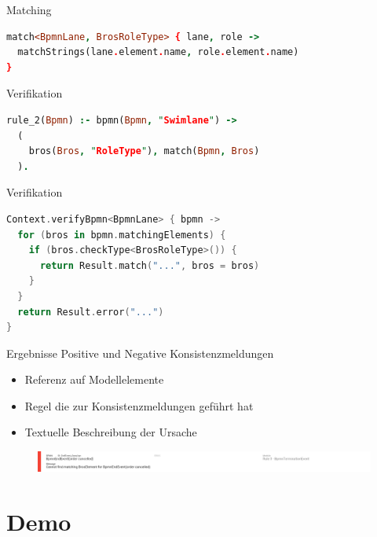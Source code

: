 \begin{frame}[fragile]{Matching}
\begin{lstlisting}[language=Prolog]
match<BpmnLane, BrosRoleType> { lane, role ->
  matchStrings(lane.element.name, role.element.name)
}
\end{lstlisting}
\end{frame}

\begin{frame}[fragile]{Verifikation}
\begin{lstlisting}[language=Prolog]
rule_2(Bpmn) :- bpmn(Bpmn, "Swimlane") ->
  (
    bros(Bros, "RoleType"), match(Bpmn, Bros)
  ).
\end{lstlisting}
\end{frame}
\begin{frame}[fragile]{Verifikation}
\begin{lstlisting}[language=Kotlin]
Context.verifyBpmn<BpmnLane> { bpmn ->
  for (bros in bpmn.matchingElements) {
    if (bros.checkType<BrosRoleType>()) {
      return Result.match("...", bros = bros)
    }
  }
  return Result.error("...")
}
\end{lstlisting}
\end{frame}


\begin{frame}{Ergebnisse}
  Positive und Negative Konsistenzmeldungen
  \begin{itemize}
    \item Referenz auf Modellelemente
    \item Regel die zur Konsistenzmeldungen geführt hat
    \item Textuelle Beschreibung der Ursache
  \end{itemize}
  \begin{figure}
    \centering
    \begin{adjustbox}{width=1.1\linewidth,center}
      \includegraphics{images/example/error3.png}
    \end{adjustbox}
  \end{figure}
\end{frame}

\section{Demo}